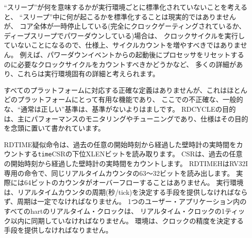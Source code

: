 \begin{commentary}
``スリープ''が何を意味するかが実行環境ごとに標準化されていないことを考えると、
``スリープ''中に何が起こるかを標準化することは現実的ではありませんが、
コア全体が一時停止している(完全にクロックゲーティングされているか、ディープスリープでパワーダウンしている)場合は、
クロックサイクルを実行していないことになるので、仕様上、サイクルカウントを増やすべきではありません。
例えば、パワーダウンイベントからの起動後にプロセッサをリセットするのに必要なクロックサイクルをカウントすべきかどうかなど、
多くの詳細があり、これらは実行環境固有の詳細と考えられます。

\begin{comment}
Even though there is no precise definition that works for all
platforms, this is still a useful facility for most platforms, and an
imprecise, common, ``usually correct'' standard here is better than no
standard.  The intent of RDCYCLE was primarily performance
monitoring/tuning, and the specification was written with that goal in
mind.
\end{comment}

すべてのプラットフォームに対応する正確な定義はありませんが、これはほとんどのプラットフォームにとって有用な機能であり、
ここでの不正確な、一般的な、``通常は正しい''基準は、基準がないよりはましです。
RDCYCLEの目的は、主にパフォーマンスのモニタリングやチューニングであり、仕様はその目的を念頭に置いて書かれています。

\end{commentary}

\begin{comment}
The RDTIME pseudoinstruction reads the low XLEN bits of the {\tt
  time} CSR, which counts wall-clock real time that has passed from an
arbitrary start time in the past.  RDTIMEH is an RV32I-only instruction
that reads bits 63--32 of the same real-time counter.  The underlying 64-bit
counter should never overflow in practice.  The execution environment
should provide a means of determining the period of the real-time
counter (seconds/tick).  The period must be constant.  The
real-time clocks of all harts in a single user application
should be synchronized to within one tick of the real-time clock.  The
environment should provide a means to determine the accuracy of the
clock.
\end{comment}

RDTIME疑似命令は、過去の任意の開始時刻から経過した壁時計の実時間をカウントする{\tt time}CSRの下位XLENビットを読み取ります。
CSRは、過去の任意の開始時刻から経過した壁時計の実時間をカウントします。
RDTIMEHはRV32I専用の命令で、同じリアルタイムカウンタの63～32ビットを読み出します。
実際には64ビットのカウンタがオーバーフローすることはありません。
実行環境は、リアルタイムカウンタの周期(秒/tick)を決定する手段を提供しなければならず、周期は一定でなければなりません。
1つのユーザー・アプリケーション内のすべてのhartのリアルタイム・クロックは、
リアルタイム・クロックの1ティック以内に同期していなければなりません。
環境は、クロックの精度を決定する手段を提供しなければなりません。

